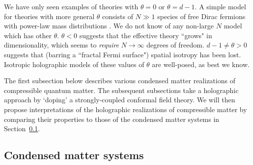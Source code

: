 \documentclass[10pt, oneside]{book}
\begin{document}
\begin{doublespace}
We have only seen examples of theories with $\theta=0$ or $\theta=d-1$.   A simple model for theories with more general $\theta$ consists of $N\gg 1$ species of free Dirac fermions with power-law mass distributions \cite{Karch:2015pha}.    We do not know of any non-large $N$ model which has other $\theta$.  $\theta<0$ suggests that the effective theory ``grows" in dimensionality, which seems to \emph{require} $N\rightarrow \infty$ degrees of freedom.   $d-1\ne \theta >0$ suggests that (barring a ``fractal Fermi surface")  spatial isotropy has been lost.   Isotropic holographic models of these values of $\theta$ are well-posed, as best we know.

The first subsection below describes various condensed matter realizations of compressible quantum matter. 
The subsequent subsections take a holographic approach by `doping' a strongly-coupled conformal field theory.
We will then propose interpretations of the holographic realizations of compressible matter by comparing their
properties to those of the condensed matter systems in Section~\ref{sec:nfl}.

\subsection{Condensed matter systems}
\label{sec:nfl}


\end{doublespace}
\end{document}
